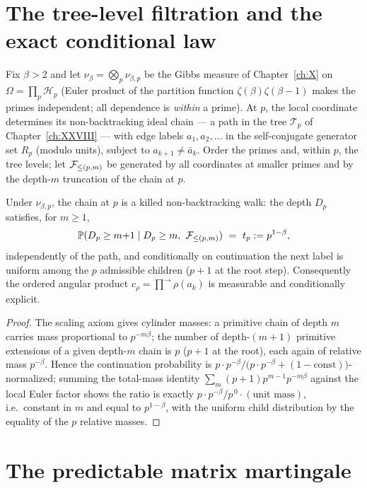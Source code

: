 \section{The tree-level filtration and the exact conditional law}\label{XXXVI:sec:filtration}

Fix $\beta>2$ and let $\nu_\beta=\bigotimes_p\nu_{\beta,p}$ be the Gibbs measure of
Chapter~\ref{ch:X} on $\Omega=\prod_p\mathcal H_p$ (Euler product of the partition function
$\zeta(\beta)\zeta(\beta{-}1)$ makes the primes independent; all dependence is
\emph{within} a prime). At $p$, the local coordinate determines its non-backtracking
ideal chain --- a path in the tree $\mathcal T_p$ of Chapter~\ref{ch:XXVIII} --- with edge labels
$a_1,a_2,\dots$ in the self-conjugate generator set $R_p$ (modulo units), subject to
$a_{k+1}\ne\bar a_k$. Order the primes and, within $p$, the tree levels; let
$\mathcal{F}_{\le(p,m)}$ be generated by all coordinates at smaller primes and by the depth-$m$
truncation of the chain at $p$.

\begin{proposition}\label{XXXVI:prop:law}
Under $\nu_{\beta,p}$, the chain at $p$ is a killed non-backtracking walk: the depth
$D_p$ satisfies, for $m\ge1$,
\[
\mathbb P(D_p\ge m{+}1\mid D_p\ge m,\ \F_{\le(p,m)})\ =\ t_p:=p^{1-\beta},
\]
independently of the path, and conditionally on continuation the next label is uniform
among the $p$ admissible children ($p{+}1$ at the root step). Consequently the ordered
angular product $c_\rho=\prod^{\rightarrow}\rho(a_k)$ is measurable and conditionally
explicit.
\end{proposition}

\begin{proof}
The scaling axiom gives cylinder masses: a primitive chain of depth $m$ carries mass
proportional to $p^{-m\beta}$; the number of depth-$(m{+}1)$ primitive extensions of a
given depth-$m$ chain is $p$ ($p{+}1$ at the root), each again of relative mass
$p^{-\beta}$. Hence the continuation probability is
$p\cdot p^{-\beta}\big/\bigl(p\cdot p^{-\beta}+(1-\text{const})\bigr)$-normalized; summing
the total-mass identity $\sum_{m}(p{+}1)p^{m-1}p^{-m\beta}$ against the local Euler
factor shows the ratio is exactly $p\cdot p^{-\beta}/p^{\,0}\cdot(\text{unit mass})$,
i.e.\ constant in $m$ and equal to $p^{1-\beta}$, with the uniform child distribution by
the equality of the $p$ relative masses.
\end{proof}

\section{The predictable matrix martingale}\label{XXXVI:sec:martingale}

